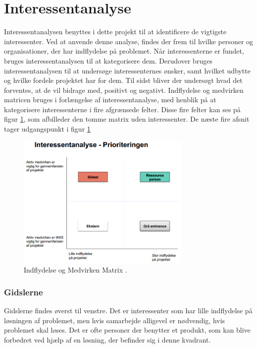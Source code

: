 \section{Interessentanalyse}
Interessentanalysen benyttes i dette projekt til at identificere de vigtigste interessenter. Ved at anvende denne analyse, findes der frem til hvilke personer og organisationer, der har indflydelse på problemet. Når interessenterne er fundet, bruges interessentanalysen til at kategorisere dem. Derudover bruges interessentanalysen til at undersøge interessenternes ønsker, samt hvilket udbytte og hvilke fordele projektet har for dem. Til sidst bliver der undersøgt hvad det forventes, at de vil bidrage med, positivt og negativt. \citep{MetteLindegaardAttrup2008}
Indflydelse og medvirken matricen bruges i forlængelse af interessentanalyse, med henblik på at kategorisere interessenterne i fire afgrænsede felter. Disse fire felter kan ses på figur \ref{fig:PavirkInflydMat}, som afbilleder den tomme matrix uden interessenter. De næste fire afsnit tager udgangspunkt i figur \ref{fig:PavirkInflydMat}

\begin{figure}[H]
    \centering
    \includegraphics[width=0.75\textwidth]{figures/Udklip.PNG}
    \caption{Indflydelse og Medvirken Matrix \citep{Holgaard2014}.} 
    \label{fig:PavirkInflydMat}
\end{figure}

\subsubsection{Gidslerne}
Gidslerne findes øverst til venstre. Det er interessenter som har lille indflydelse på løsningen af problemet, men hvis samarbejde alligevel er nødvendig, hvis problemet skal løses. Det er ofte personer der benytter et produkt, som kan blive forbedret ved hjælp af en løsning, der befinder sig i denne kvadrant. \citep{MetteLindegaardAttrup2008}

